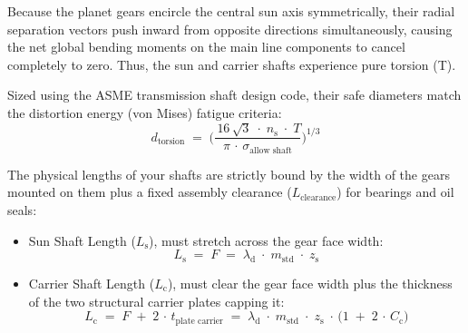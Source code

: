         Because the planet gears encircle the central sun axis symmetrically, their radial separation vectors push 
        inward from opposite directions simultaneously, causing the net global bending moments on the main line 
        components to cancel completely to zero. Thus, the sun and carrier shafts experience pure torsion (T).

        Sized using the ASME transmission shaft design code, their safe diameters match the distortion 
        energy (von Mises) fatigue criteria: 
            \begin{equation}
                \label{eq:torsiondia}
                d_{\text{torsion}}
                \;=\;
                \biggl( \frac{\,16\,\sqrt{3}\;\cdot\;n_{\text{s}}\;\cdot\;T}
                {\pi\,\cdot\,\sigma_{\text{allow shaft}}}\biggr)^{1/3}
            \end{equation}

        The physical lengths of your shafts are strictly bound by the width of the gears mounted on them plus 
        a fixed assembly clearance ($L_{\text{clearance}}$) for bearings and oil seals: 
            \begin{itemize}
				\item Sun Shaft Length ($L_{\text{s}}$), must stretch across the gear face width:
                    \begin{equation}
                        \label{eq:sunshaftlength}
                        L_{\text{s}}
                        \;=\;
                        F
                        \;=\;
                        \lambda_{\text{d}}\;\cdot\;m_{\text{std}}\;\cdot\;z_{\text{s}}
                    \end{equation}

                \item Carrier Shaft Length ($L_{\text{c}}$), must clear the gear face width plus the thickness 
                of the two structural carrier plates capping it:
                    \begin{equation}
                        \label{eq:carriershaftlength}
                        L_{\text{c}}
                        \;=\;
                        F\;+\;2\,\cdot\,t_{\text{plate carrier}}
                        \;=\;
                        \lambda_{\text{d}}\;\cdot\;m_{\text{std}}\;\cdot\;z_{\text{s}}\;
                        \cdot\,\bigl(1\;+\;2\,\cdot\,C_{\text{c}}\bigr)
                    \end{equation}
			\end{itemize}

